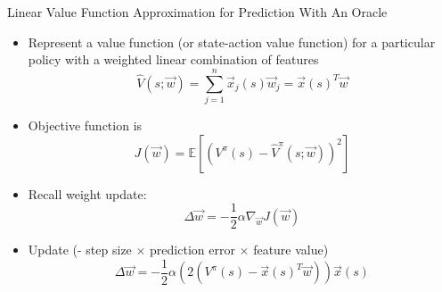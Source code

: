 \begin{frame}[c]{Linear Value Function Approximation for Prediction With
		An Oracle}
	
	
	\begin{itemize}
		\item Represent a value function (or state-action value function) for a
		particular policy with a weighted linear combination of features
		$$ \hat{V}(s; \vec{w}) = \sum_{j=1}^n \vec{x}_j (s) \vec{w}_j = \vec{x}(s)^T\vec{w}$$
		\item Objective function is 
		$$ J(\vec{w}) = \mathbb{E}[(V^\pi(s) - \hat{V}^\pi(s; \vec{w}))^2]$$
		\item Recall weight update:
		$$ \Delta \vec{w} = - \frac{1}{2} \alpha \nabla_{\vec{w}} J (\vec{w})$$
		\item Update (- step size $\times$ prediction error $\times$ feature value)
		$$ \Delta \vec{w} = -\frac{1}{2} \alpha(2(V^\pi(s) - \vec{x}(s)^T \vec{w})) \vec{x}(s)$$
		
	\end{itemize}
	
\end{frame}

